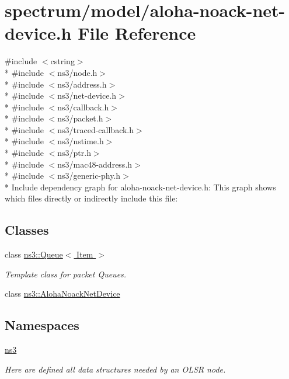 \hypertarget{aloha-noack-net-device_8h}{}\section{spectrum/model/aloha-\/noack-\/net-\/device.h File Reference}
\label{aloha-noack-net-device_8h}
{\ttfamily \#include $<$cstring$>$}\\*
{\ttfamily \#include $<$ns3/node.\+h$>$}\\*
{\ttfamily \#include $<$ns3/address.\+h$>$}\\*
{\ttfamily \#include $<$ns3/net-\/device.\+h$>$}\\*
{\ttfamily \#include $<$ns3/callback.\+h$>$}\\*
{\ttfamily \#include $<$ns3/packet.\+h$>$}\\*
{\ttfamily \#include $<$ns3/traced-\/callback.\+h$>$}\\*
{\ttfamily \#include $<$ns3/nstime.\+h$>$}\\*
{\ttfamily \#include $<$ns3/ptr.\+h$>$}\\*
{\ttfamily \#include $<$ns3/mac48-\/address.\+h$>$}\\*
{\ttfamily \#include $<$ns3/generic-\/phy.\+h$>$}\\*
Include dependency graph for aloha-\/noack-\/net-\/device.h\+:
This graph shows which files directly or indirectly include this file\+:
\subsection*{Classes}
\begin{DoxyCompactItemize}
\item 
class \hyperlink{classns3_1_1Queue}{ns3\+::\+Queue$<$ Item $>$}
\begin{DoxyCompactList}\small\item\em Template class for packet Queues. \end{DoxyCompactList}\item 
class \hyperlink{classns3_1_1AlohaNoackNetDevice}{ns3\+::\+Aloha\+Noack\+Net\+Device}
\end{DoxyCompactItemize}
\subsection*{Namespaces}
\begin{DoxyCompactItemize}
\item 
 \hyperlink{namespacens3}{ns3}
\begin{DoxyCompactList}\small\item\em Here are defined all data structures needed by an O\+L\+SR node. \end{DoxyCompactList}\end{DoxyCompactItemize}
